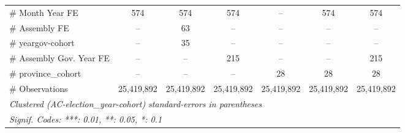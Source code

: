 \begin{table}[htbp]
\begin{tabular}{lcccccc}
      \# Month Year FE              & 574           & 574           & 574           & --            & 574           & 574\\  
      \# Assembly FE                & --            & 63            & --            & --            & --            & --\\  
      \# yeargov-cohort             & --            & 35            & --            & --            & --            & --\\  
      \# Assembly Gov. Year FE      & --            & --            & 215           & --            & --            & 215\\  
      \# province\_cohort           & --            & --            & --            & 28            & 28            & 28\\  
      \# Observations               & 25,419,892    & 25,419,892    & 25,419,892    & 25,419,892    & 25,419,892    & 25,419,892\\  
      \midrule \midrule
      \multicolumn{7}{l}{\emph{Clustered (AC-election\_year-cohort) standard-errors in parentheses}}\\
      \multicolumn{7}{l}{\emph{Signif. Codes: ***: 0.01, **: 0.05, *: 0.1}}\\
   \end{tabular}
\end{table}


